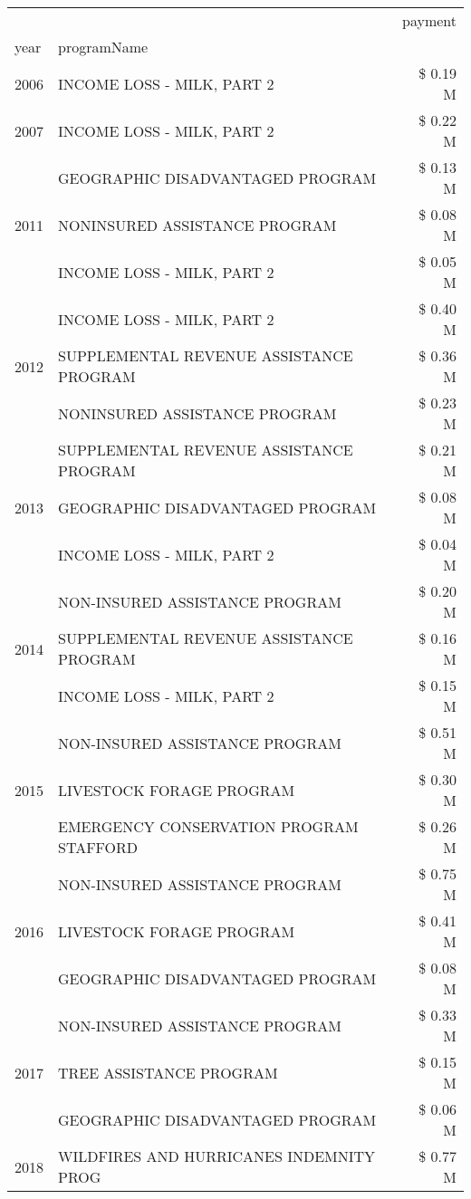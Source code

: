 \begin{tabular}{llr}
\toprule
 &  & payment \\
year & programName &  \\
\midrule
2006 & INCOME LOSS - MILK, PART 2 & \$ 0.19 M \\
\cline{1-3}
2007 & INCOME LOSS - MILK, PART 2 & \$ 0.22 M \\
\cline{1-3}
\multirow[t]{3}{*}{2011} & GEOGRAPHIC DISADVANTAGED PROGRAM & \$ 0.13 M \\
 & NONINSURED ASSISTANCE PROGRAM & \$ 0.08 M \\
 & INCOME LOSS - MILK, PART 2 & \$ 0.05 M \\
\cline{1-3}
\multirow[t]{3}{*}{2012} & INCOME LOSS - MILK, PART 2 & \$ 0.40 M \\
 & SUPPLEMENTAL REVENUE ASSISTANCE PROGRAM & \$ 0.36 M \\
 & NONINSURED ASSISTANCE PROGRAM & \$ 0.23 M \\
\cline{1-3}
\multirow[t]{3}{*}{2013} & SUPPLEMENTAL REVENUE ASSISTANCE PROGRAM & \$ 0.21 M \\
 & GEOGRAPHIC DISADVANTAGED PROGRAM & \$ 0.08 M \\
 & INCOME LOSS - MILK, PART 2 & \$ 0.04 M \\
\cline{1-3}
\multirow[t]{3}{*}{2014} & NON-INSURED ASSISTANCE PROGRAM & \$ 0.20 M \\
 & SUPPLEMENTAL REVENUE ASSISTANCE PROGRAM & \$ 0.16 M \\
 & INCOME LOSS - MILK, PART 2 & \$ 0.15 M \\
\cline{1-3}
\multirow[t]{3}{*}{2015} & NON-INSURED ASSISTANCE PROGRAM & \$ 0.51 M \\
 & LIVESTOCK FORAGE PROGRAM & \$ 0.30 M \\
 & EMERGENCY CONSERVATION PROGRAM STAFFORD & \$ 0.26 M \\
\cline{1-3}
\multirow[t]{3}{*}{2016} & NON-INSURED ASSISTANCE PROGRAM & \$ 0.75 M \\
 & LIVESTOCK FORAGE PROGRAM & \$ 0.41 M \\
 & GEOGRAPHIC DISADVANTAGED PROGRAM & \$ 0.08 M \\
\cline{1-3}
\multirow[t]{3}{*}{2017} & NON-INSURED ASSISTANCE PROGRAM & \$ 0.33 M \\
 & TREE ASSISTANCE PROGRAM & \$ 0.15 M \\
 & GEOGRAPHIC DISADVANTAGED PROGRAM & \$ 0.06 M \\
\cline{1-3}
\multirow[t]{3}{*}{2018} & WILDFIRES AND HURRICANES INDEMNITY PROG & \$ 0.77 M \\

\end{tabular}

